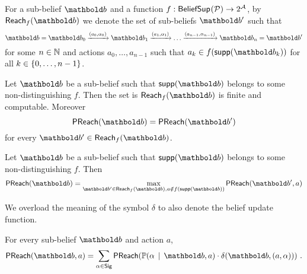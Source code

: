 %
%
\begin{notation}
For a sub-belief $\bel{b}$ and a function $f : \mathsf{BeliefSup}_{}(\mathcal{P}) \to 2^{\mathcal{A}}$,
by $\reach{f}(\bel{b})$ we denote the set of sub-beliefs $\bel{b}'$ such that
\[
\bel{b} =
\bel{b}_0 \xrightarrow{(a_0,\alpha_0)}
\bel{b}_1 \xrightarrow{(a_1,\alpha_1)}
\dots
\xrightarrow{(a_{n-1},\alpha_{n-1})}
\bel{b}_n = \bel{b}'
\]
for some $n\in\mathbb{N}$ and actions $a_0,\dots,a_{n-1}$ such that $a_k\in f(\supp{\bel{b}_k})$ for all $k\in\left\lbrace 0,\dots,n-1\right\rbrace$.
\end{notation}
%
\begin{lemma}
Let $\bel{b}$ be a sub-belief such that $\supp{\bel{b}}$ belongs to some non-distinguishing \adscc{} $f$.
Then the set is $\reach{f}(\bel{b})$ is finite and computable.
Moreover
\[
\preach(\bel{b}) = \preach(\bel{b}')
\]
for every $\bel{b}' \in \reach{f}(\bel{b})$.
\end{lemma}
%
\begin{lemma}
Let $\bel{b}$ be a sub-belief such that $\supp{\bel{b}}$ belongs to some non-distinguishing \adscc{} $f$.
Then
\[
\preach(\bel{b}) =
\max_{\bel{b}'\in\reach{f}(\bel{b}),
a\notin f(\supp{\bel{b}})}
\preach(\bel{b}',a)
\]
\end{lemma}
%
\begin{notation}
We overload the meaning of the symbol $\delta$ to also denote the belief update function.
\end{notation}
%
\begin{lemma}
For every sub-belief $\bel{b}$ and action $a$,
\[
\preach(\bel{b},a) =
\sum_{\alpha\in\sig}
\preach(\pgiven{\alpha}{\bel{b},a}\cdot{\beltr{\bel{b}}{(a,\alpha)}}) \ .
\]
\end{lemma}
%
